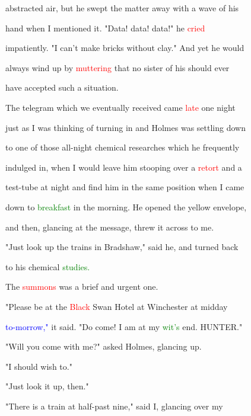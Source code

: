  abstracted air, but he swept the matter away with a wave of his

 hand when I mentioned it. "Data! data! data!" he \textcolor{red}{cried}

 impatiently. "I can't make bricks without clay." And yet he would

 always wind up by \textcolor{red}{muttering} that no sister of his should ever

 have accepted such a situation.



 The telegram which we eventually received came \textcolor{red}{late} one night

 just as I was thinking of turning in and Holmes was settling down

 to one of those all-night chemical researches which he frequently

 indulged in, when I would \textcolor{BurntOrange}{leave} him stooping over a \textcolor{red}{retort} and a

 test-tube at night and find him in the same position when I came

 down to \textcolor{green}{breakfast} in the morning. He opened the yellow envelope,

 and then, glancing at the message, threw it across to me.



 "Just look up the trains in Bradshaw," said he, and turned back

 to his chemical \textcolor{green}{studies.}



 The \textcolor{red}{summons} was a brief and \textcolor{BurntOrange}{urgent} one.



 "Please be at the \textcolor{red}{Black} Swan Hotel at Winchester at midday

 \textcolor{blue}{to-morrow,"} it said. "Do come! I am at my \textcolor{green}{wit's} end. \textcolor{BurntOrange}{HUNTER."}



 "Will you come with me?" asked Holmes, glancing up.



 "I should wish to."



 "Just look it up, then."



 "There is a train at half-past nine," said I, glancing over my

